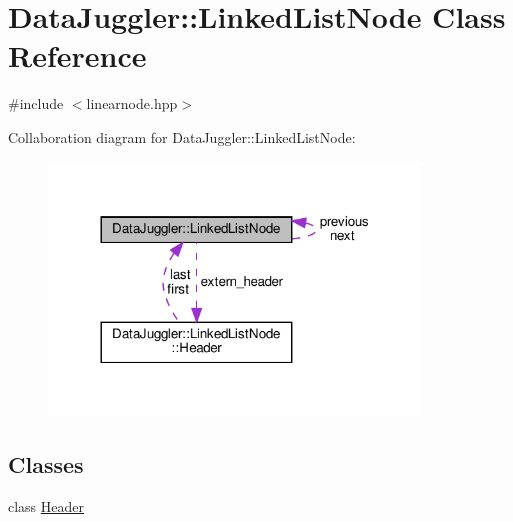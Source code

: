 \hypertarget{classDataJuggler_1_1LinkedListNode}{}\section{Data\+Juggler\+:\+:Linked\+List\+Node Class Reference}
\label{classDataJuggler_1_1LinkedListNode}


{\ttfamily \#include $<$linearnode.\+hpp$>$}



Collaboration diagram for Data\+Juggler\+:\+:Linked\+List\+Node\+:\nopagebreak
\begin{figure}[H]
\begin{center}
\leavevmode
\includegraphics[width=281pt]{classDataJuggler_1_1LinkedListNode__coll__graph}
\end{center}
\end{figure}
\subsection*{Classes}
\begin{DoxyCompactItemize}
\item 
class \hyperlink{classDataJuggler_1_1LinkedListNode_1_1Header}{Header}
\end{DoxyCompactItemize}
